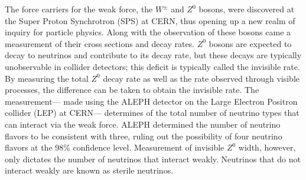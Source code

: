 The force carriers for the weak force, the $W^\pm$ and $Z^0$ bosons, were discovered at the Super Proton Synchrotron (SPS) at CERN, thus opening up a new realm of inquiry for particle physics.\cite{wBoson, zBoson}  Along with the observation of these bosons came a measurement of their cross sections and decay rates.  $Z^0$ bosons are expected to decay to neutrinos and contribute to its decay rate, but these decays are typically unobservable in collider detectors; this deficit is typically called the invisible rate.  By measuring the total $Z^0$ decay rate as well as the rate observed through visible processes, the difference can be taken to obtain the invisible rate.  The measurement--- made using the ALEPH detector on the Large Electron Positron collider (LEP) at CERN--- determines of the total number of neutrino types that can interact via the weak force.  ALEPH determined the number of neutrino flavors to be consistent with three, ruling out the possibility of four neutrino flavors at the 98\% confidence level.  \cite{aleph}  Measurement of invisible $Z^0$ width, however, only dictates the number of neutrinos that interact weakly.  Neutrinos that do not interact weakly are known as sterile neutrinos.  

